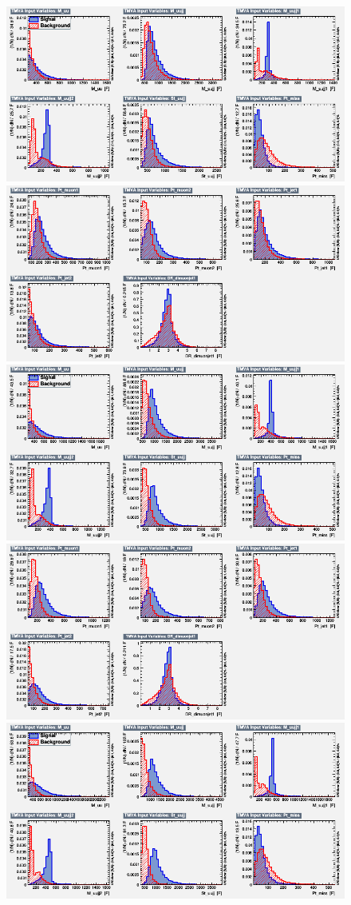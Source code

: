 \begin{figure}[H]
    \centering
    {\includegraphics[width=.49\textwidth]{Images/Analysis/Results_LQToBMu_pair_uubj_BDTG_FullRun2_2023_01_25_020318/300/variables_id_c1.png}}
    {\includegraphics[width=.49\textwidth]{Images/Analysis/Results_LQToBMu_pair_uubj_BDTG_FullRun2_2023_01_25_020318/300/variables_id_c2.png}}
    {\includegraphics[width=.49\textwidth]{Images/Analysis/Results_LQToBMu_pair_uubj_BDTG_FullRun2_2023_01_25_020318/400/variables_id_c1.png}}
    {\includegraphics[width=.49\textwidth]{Images/Analysis/Results_LQToBMu_pair_uubj_BDTG_FullRun2_2023_01_25_020318/400/variables_id_c2.png}}
    {\includegraphics[width=.49\textwidth]{Images/Analysis/Results_LQToBMu_pair_uubj_BDTG_FullRun2_2023_01_25_020318/500/variables_id_c1.png}}

\end{figure}
